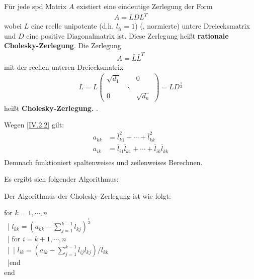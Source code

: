\begin{Fole}
	\label{4.2.2}
	Für jede spd Matrix $A$ existiert eine eindeutige Zerlegung der Form 
	\begin{gather*}
	A= LDL^T
	\end{gather*}
	wobei $L$ eine reelle unipotente (d.h. $l_{ii}=1$)  (, normierte)  untere 
	Dreiecksmatrix  und $D$ eine positive Diagonalmatrix ist. 
	Diese Zerlegung heißt \textbf{rationale Cholesky-Zerlegung}. Die Zerlegung
	\begin{gather}
	A= \bar{L}\bar{L}^T 
	\label{IV.2.2}
	\end{gather}
	mit der reellen unteren Dreiecksmatrix
	\begin{gather*}
	\bar{L} = L \begin{pmatrix}
	\sqrt{d_1} &&0 \\
	& \ddots & \\
	0&& \sqrt{d_n}
	\end{pmatrix} = LD^{\frac{1}{2}}
	\end{gather*}
	heißt \textbf{Cholesky-Zerlegung.} .
	
	Wegen \eqref{IV.2.2} gilt: 
	\begin{align}
	a_{kk} &= \bar{l}_{k1}^{2} + \cdots +  \bar{l}_{kk}^2  \label{IV.2.3} \\
	a_{ik} &= \bar{l}_{i1} \bar{l}_{k1} + \cdots + \bar{l}_{ik} \bar{l}_{kk}  \label{IV.2.4} \\
	\end{align}
	Demnach funktioniert spaltenweises und zeilenweises Berechnen. 
\end{Fole}

Es ergibt sich folgender Algorithmus:


Der Algorithmus der Cholesky-Zerlegung ist wie folgt:

\begin{pseudocode}{0.55\linewidth}
	for  $k=1, \cdots , n$\\
	~|\> $l_{kk} = (a_{kk}-\sum_{j=1}^{k-1}l_{kj})^{\frac{1}{2}}$ \\
	~|\> for $i= k+1, \cdots , n$ \\
	~|\>~|\> $l_{ik} = ( a_{ik}- \sum_{j=1}^{k-1}l_{ij} l_{kj})/{l_{kk}}$  \\
	~|\>end\\
	end
\end{pseudocode}



